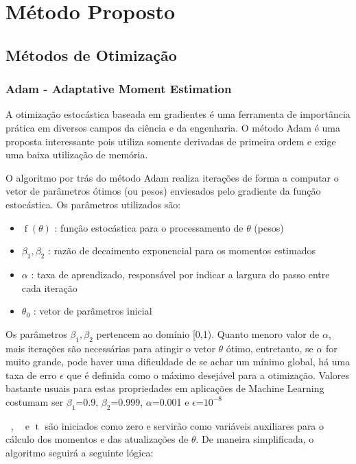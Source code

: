 \chapter{Método Proposto}

\section{Métodos de Otimização}
\subsection{Adam - Adaptative Moment Estimation}

A otimização estocástica baseada em gradientes é uma ferramenta de importância prática em diversos campos da ciência e da engenharia. O método Adam é uma proposta interessante pois utiliza somente derivadas de primeira ordem e exige uma baixa utilização de memória.

O algoritmo por trás do método Adam realiza iterações de forma a computar o vetor de parâmetros ótimos (ou pesos) enviesados pelo gradiente da função estocástica. Os parâmetros utilizados são: 

\begin{itemize}
    \item $\mathop{f}(\theta)$ : função estocástica para o processamento de $\theta$ (pesos)
    \item $\beta_{1},\beta_{2}$ : razão de decaimento exponencial para os momentos estimados
    \item $\alpha$ : taxa de aprendizado, responsável por indicar a largura do passo entre cada iteração
    \item $\theta_{0}$ : vetor de parâmetros inicial
\end{itemize} 

Os parâmetros $\beta_{1},\beta_{2}$ pertencem ao domínio [0,1). Quanto menoro valor de $\alpha$, mais iterações são necessárias para atingir o vetor $\theta$ ótimo, entretanto, se $\alpha$ for muito grande, pode haver uma dificuldade de se achar um mínimo global, há uma taxa de erro $\epsilon$ que é definida como o máximo desejável para a otimização. Valores bastante usuais para estas propriedades em aplicações de Machine Learning costumam ser $\beta_{1}$=0.9, $\beta_{2}$=0.999, $\alpha$=0.001 e $\epsilon$=$10^{-8}$

$\mathop{m_{0}}$, $\mathop{v_{0}}$ e $\mathop{t}$ são iniciados como zero e servirão como variáveis auxiliares para o cálculo dos momentos e das atualizações de $\theta$. De maneira simplificada, o algoritmo seguirá a seguinte lógica:

